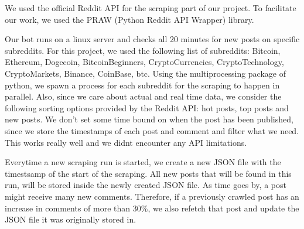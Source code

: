 We used the official Reddit API for the scraping part of our project. To facilitate our work, we used the PRAW (Python Reddit API Wrapper) library.

Our bot runs on a linux server and checks all 20 minutes for new posts on specific subreddits. For this project, we used the following list of subreddits: Bitcoin, Ethereum, Dogecoin, BitcoinBeginners, CryptoCurrencies, CryptoTechnology, CryptoMarkets, Binance, CoinBase, btc.
Using the multiprocessing package of python, we spawn a process for each subreddit for the scraping to happen in parallel.
Also, since we care about actual and real time data, we consider the following sorting options provided by the Reddit API: hot posts, top posts and new posts. We don't set some time bound on when the post has been published, since we store the timestamps of each post and comment and filter what we need. This works really well and we didnt encounter any API limitations.

Everytime a new scraping run is started, we create a new JSON file with the timestsamp of the start of the scraping. All new posts that will be found in this run, will be stored inside the newly created JSON file. As time goes by, a post might receive many new comments. Therefore, if a previously crawled post has an increase in comments of more than 30\%, we also refetch that post and update the JSON file it was originally stored in. 